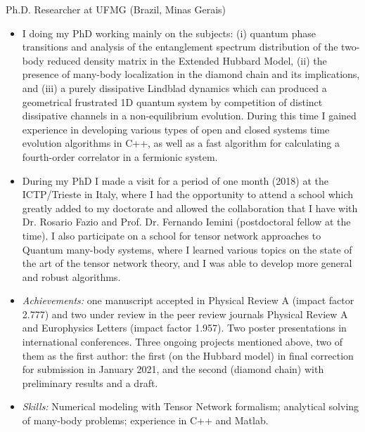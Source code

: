 \documentclass[a4paper,10pt]{article}
\newlength{\cvcolumngapwidth}
\newlength{\cvleftcolumnwidth}
\newlength{\cvrightcolumnwidth}
\newcommand{\cvtitlestyle}[1]{{\normalsize\cvtitlefont\textcolor{cvtitlecolor}{#1}}}
\newcommand{\cvdurationstyle}[1]{{\normalsize\cvdurationfont\textcolor{cvdurationcolor}{#1}}}
\newlength{\cvafteritemskipamount}
\newlength{\cvaftertitleskipamount}
\newlength{\cvparskip}
\newcommand{\cvitem}[2]{
    \begin{minipage}[t]{\cvleftcolumnwidth}
        \raggedleft #1
    \end{minipage}%
    \hspace{\cvcolumngapwidth}%
    \begin{minipage}[t]{\cvrightcolumnwidth}
        \setlength{\parskip}{\cvparskip} #2
    \end{minipage}
    \vspace{\cvafteritemskipamount}}
\newcommand{\cvtitle}[1]{
    \cvtitlestyle{#1}
    \vspace{\cvaftertitleskipamount}
    \vspace{-\cvparskip}}
\begin{document}
\cvitem{\cvdurationstyle{2016 - Present}}
    {\cvtitle{Ph.D. Researcher at UFMG (Brazil, Minas Gerais)}
    
    \begin{itemize}[leftmargin=*]
        \vspace{0.2cm}
        \item I doing my PhD working mainly on the subjects: (i) quantum phase transitions and analysis of the entanglement spectrum distribution of the two-body reduced density matrix in the Extended Hubbard Model, (ii) the presence of many-body localization in the diamond chain and its implications, and (iii) a purely dissipative Lindblad dynamics which can produced a geometrical frustrated 1D quantum system by competition of distinct dissipative channels in a non-equilibrium evolution. During this time I gained experience in developing various types of open and closed systems time evolution algorithms in C++, as well as a fast algorithm for calculating a fourth-order correlator in a fermionic system.
        \vspace{0.2cm}
        \item During my PhD I made a visit for a period of one month (2018) at the ICTP/Trieste in Italy, where I had the opportunity to attend a school which greatly added to my doctorate and allowed the collaboration that I have with Dr. Rosario Fazio and Prof. Dr. Fernando Iemini (postdoctoral fellow at the time). I also participate on a school for tensor network approaches to Quantum many-body systems, where I learned various topics on the state of the art of the tensor network theory, and I was able to develop more general and robust algorithms.
        \vspace{0.2cm}
        \item \textit{Achievements:} one manuscript accepted in Physical Review A (impact factor 2.777) and two under review in the peer review journals Physical Review A and Europhysics Letters (impact factor 1.957). Two poster presentations in international conferences. Three ongoing projects mentioned above, two of them as the first author: the first (on the Hubbard model) in final correction for submission in January 2021, and the second (diamond chain) with preliminary results and a draft.
        \vspace{0.2cm}
        \item \textit{Skills:} Numerical modeling with Tensor Network formalism;
        analytical solving of many-body problems; experience in C++ and Matlab.
    \end{itemize}}
\end{document}
